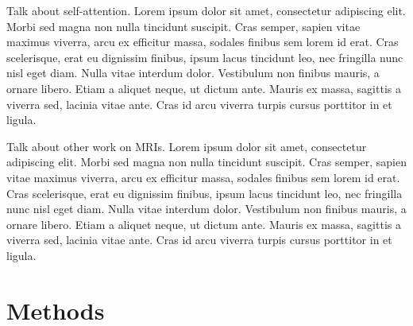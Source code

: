 \documentclass[10pt,twocolumn,letterpaper]{article}
\begin{document}
Talk about self-attention.
Lorem ipsum dolor sit amet, consectetur adipiscing elit. Morbi sed magna non nulla tincidunt suscipit. Cras semper, sapien vitae maximus viverra, arcu ex efficitur massa, sodales finibus sem lorem id erat. Cras scelerisque, erat eu dignissim finibus, ipsum lacus tincidunt leo, nec fringilla nunc nisl eget diam. Nulla vitae interdum dolor. Vestibulum non finibus mauris, a ornare libero. Etiam a aliquet neque, ut dictum ante. Mauris ex massa, sagittis a viverra sed, lacinia vitae ante. Cras id arcu viverra turpis cursus porttitor in et ligula.

Talk about other work on MRIs.
Lorem ipsum dolor sit amet, consectetur adipiscing elit. Morbi sed magna non nulla tincidunt suscipit. Cras semper, sapien vitae maximus viverra, arcu ex efficitur massa, sodales finibus sem lorem id erat. Cras scelerisque, erat eu dignissim finibus, ipsum lacus tincidunt leo, nec fringilla nunc nisl eget diam. Nulla vitae interdum dolor. Vestibulum non finibus mauris, a ornare libero. Etiam a aliquet neque, ut dictum ante. Mauris ex massa, sagittis a viverra sed, lacinia vitae ante. Cras id arcu viverra turpis cursus porttitor in et ligula.

\section{Methods} %
\end{document}
